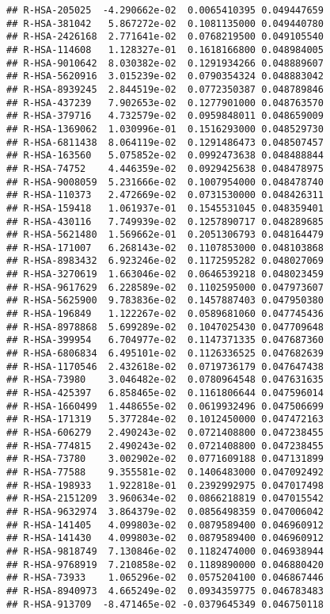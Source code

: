 \documentclass[
]{article}
\begin{document}
\begin{verbatim}
## R-HSA-205025  -4.290662e-02  0.0065410395 0.049447659
## R-HSA-381042   5.867272e-02  0.1081135000 0.049440780
## R-HSA-2426168  2.771641e-02  0.0768219500 0.049105540
## R-HSA-114608   1.128327e-01  0.1618166800 0.048984005
## R-HSA-9010642  8.030382e-02  0.1291934266 0.048889607
## R-HSA-5620916  3.015239e-02  0.0790354324 0.048883042
## R-HSA-8939245  2.844519e-02  0.0772350387 0.048789846
## R-HSA-437239   7.902653e-02  0.1277901000 0.048763570
## R-HSA-379716   4.732579e-02  0.0959848011 0.048659009
## R-HSA-1369062  1.030996e-01  0.1516293000 0.048529730
## R-HSA-6811438  8.064119e-02  0.1291486473 0.048507457
## R-HSA-163560   5.075852e-02  0.0992473638 0.048488844
## R-HSA-74752    4.446359e-02  0.0929425638 0.048478975
## R-HSA-9008059  5.231666e-02  0.1007954000 0.048478740
## R-HSA-110373   2.472669e-02  0.0731530000 0.048426311
## R-HSA-159418   1.061937e-01  0.1545531045 0.048359401
## R-HSA-430116   7.749939e-02  0.1257890717 0.048289685
## R-HSA-5621480  1.569662e-01  0.2051306793 0.048164479
## R-HSA-171007   6.268143e-02  0.1107853000 0.048103868
## R-HSA-8983432  6.923246e-02  0.1172595282 0.048027069
## R-HSA-3270619  1.663046e-02  0.0646539218 0.048023459
## R-HSA-9617629  6.228589e-02  0.1102595000 0.047973607
## R-HSA-5625900  9.783836e-02  0.1457887403 0.047950380
## R-HSA-196849   1.122267e-02  0.0589681060 0.047745436
## R-HSA-8978868  5.699289e-02  0.1047025430 0.047709648
## R-HSA-399954   6.704977e-02  0.1147371335 0.047687360
## R-HSA-6806834  6.495101e-02  0.1126336525 0.047682639
## R-HSA-1170546  2.432618e-02  0.0719736179 0.047647438
## R-HSA-73980    3.046482e-02  0.0780964548 0.047631635
## R-HSA-425397   6.858465e-02  0.1161806644 0.047596014
## R-HSA-1660499  1.448655e-02  0.0619932496 0.047506699
## R-HSA-171319   5.377284e-02  0.1012450000 0.047472163
## R-HSA-606279   2.490243e-02  0.0721408800 0.047238455
## R-HSA-774815   2.490243e-02  0.0721408800 0.047238455
## R-HSA-73780    3.002902e-02  0.0771609188 0.047131899
## R-HSA-77588    9.355581e-02  0.1406483000 0.047092492
## R-HSA-198933   1.922818e-01  0.2392992975 0.047017498
## R-HSA-2151209  3.960634e-02  0.0866218819 0.047015542
## R-HSA-9632974  3.864379e-02  0.0856498359 0.047006042
## R-HSA-141405   4.099803e-02  0.0879589400 0.046960912
## R-HSA-141430   4.099803e-02  0.0879589400 0.046960912
## R-HSA-9818749  7.130846e-02  0.1182474000 0.046938944
## R-HSA-9768919  7.210858e-02  0.1189890000 0.046880420
## R-HSA-73933    1.065296e-02  0.0575204100 0.046867446
## R-HSA-8940973  4.665249e-02  0.0934359775 0.046783483
## R-HSA-913709  -8.471465e-02 -0.0379645349 0.046750118

\end{verbatim}
\end{document}
